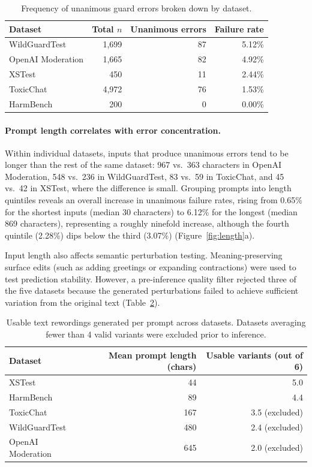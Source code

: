 \documentclass[11pt]{article}
\begin{document}
\begin{table}[ht]
\centering
\small
\caption{Frequency of unanimous guard errors broken down by dataset.}
\label{tab:unanimous}
\begin{tabular}{lrrr}
\toprule
Dataset & Total $n$ & Unanimous errors & Failure rate \\
\midrule
WildGuardTest & 1,699 & 87 & 5.12\% \\
OpenAI Moderation & 1,665 & 82 & 4.92\% \\
XSTest & 450 & 11 & 2.44\% \\
ToxicChat & 4,972 & 76 & 1.53\% \\
HarmBench & 200 & 0 & 0.00\% \\
\bottomrule
\end{tabular}
\end{table}

\paragraph{Prompt length correlates with error concentration.} Within individual datasets, inputs that produce unanimous errors tend to be longer than the rest of the same dataset: 967 vs.\ 363 characters in OpenAI Moderation, 548 vs.\ 236 in WildGuardTest, 83 vs.\ 59 in ToxicChat, and 45 vs.\ 42 in XSTest, where the difference is small. Grouping prompts into length quintiles reveals an overall increase in unanimous failure rates, rising from 0.65\% for the shortest inputs (median 30 characters) to 6.12\% for the longest (median 869 characters), representing a roughly ninefold increase, although the fourth quintile (2.28\%) dips below the third (3.07\%) (Figure~\ref{fig:length}a).

Input length also affects semantic perturbation testing. Meaning-preserving surface edits (such as adding greetings or expanding contractions) were used to test prediction stability. However, a pre-inference quality filter rejected three of the five datasets because the generated perturbations failed to achieve sufficient variation from the original text (Table~\ref{tab:variants}).

\begin{table}[ht]
\centering
\small
\caption{Usable text rewordings generated per prompt across datasets. Datasets averaging fewer than 4 valid variants were excluded prior to inference.}
\label{tab:variants}
\begin{tabular}{lrr}
\toprule
Dataset & Mean prompt length (chars) & Usable variants (out of 6) \\
\midrule
XSTest & 44 & 5.0 \\
HarmBench & 89 & 4.4 \\
ToxicChat & 167 & 3.5 (excluded) \\
WildGuardTest & 480 & 2.4 (excluded) \\
OpenAI Moderation & 645 & 2.0 (excluded) \\
\bottomrule
\end{tabular}
\end{table}
\end{document}
